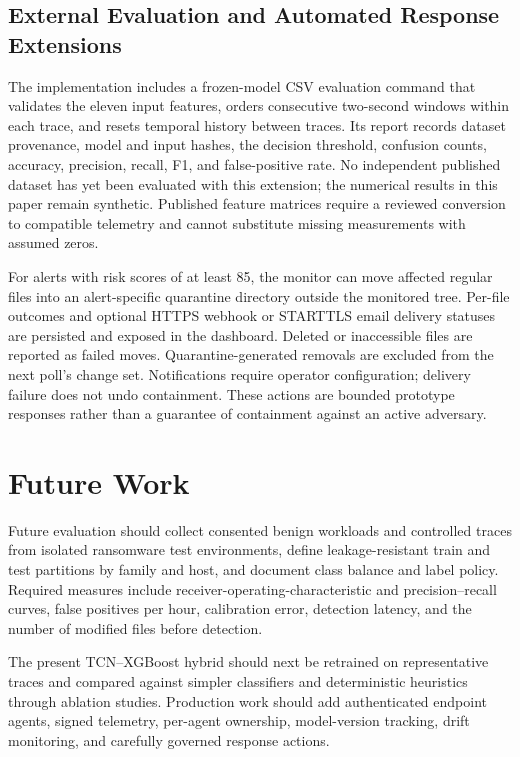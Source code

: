 \documentclass[conference]{IEEEtran}
\begin{document}
\subsection{External Evaluation and Automated Response Extensions}
The implementation includes a frozen-model CSV evaluation command that validates
the eleven input features, orders consecutive two-second windows within each
trace, and resets temporal history between traces. Its report records dataset
provenance, model and input hashes, the decision threshold, confusion counts,
accuracy, precision, recall, F1, and false-positive rate. No independent published
dataset has yet been evaluated with this extension; the numerical results in this
paper remain synthetic. Published feature matrices require a reviewed conversion
to compatible telemetry and cannot substitute missing measurements with assumed
zeros.

For alerts with risk scores of at least 85, the monitor can move affected regular
files into an alert-specific quarantine directory outside the monitored tree.
Per-file outcomes and optional HTTPS webhook or STARTTLS email delivery statuses
are persisted and exposed in the dashboard. Deleted or inaccessible files are
reported as failed moves. Quarantine-generated removals are excluded from the next
poll's change set. Notifications require operator configuration; delivery failure
does not undo containment. These actions are bounded prototype responses rather
than a guarantee of containment against an active adversary.

\section{Future Work}
Future evaluation should collect consented benign workloads and controlled traces
from isolated ransomware test environments, define leakage-resistant train and
test partitions by family and host, and document class balance and label policy.
Required measures include receiver-operating-characteristic and
precision--recall curves, false positives per hour, calibration error, detection
latency, and the number of modified files before detection.

The present TCN--XGBoost hybrid should next be retrained on representative traces
and compared against simpler classifiers and deterministic heuristics through
ablation studies. Production work should add authenticated
endpoint agents, signed telemetry, per-agent ownership, model-version tracking,
drift monitoring, and carefully governed response actions.
\end{document}
